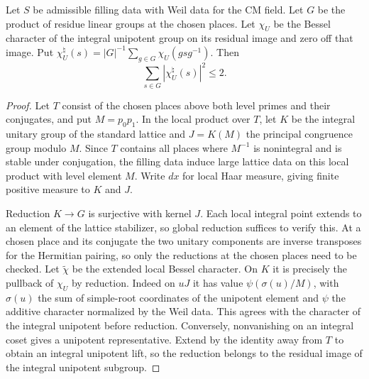 \begin{lemma}
\label{lem:b-conjugation-l2}
\emitthmsource
Let $S$ be admissible filling data with Weil data for the CM field. Let $G$ be the product of residue linear groups at the chosen places.
Let $\chi_U$ be the Bessel character of the integral unipotent group on its residual image and zero off that image.
Put $\chi_U^\natural(s)=|G|^{-1}\sum_{g\in G}\chi_U(gsg^{-1})$.
Then
\[
 \sum_{s\in G}|\chi_U^\natural(s)|^2\le2.
\]
\end{lemma}
\begin{proof}
Let $T$ consist of the chosen places above both level primes and their conjugates, and put $M=p_0p_1$.
In the local product over $T$, let $K$ be the integral unitary group of the standard lattice and $J=K(M)$ the principal congruence group modulo $M$.
Since $T$ contains all places where $M^{-1}$ is nonintegral and is stable under conjugation,
the filling data induce large lattice data on this local product with level element $M$.
Write $dx$ for local Haar measure, giving finite positive measure to $K$ and $J$.

Reduction $K\to G$ is surjective with kernel $J$.
Each local integral point extends to an element of the lattice stabilizer, so global reduction suffices to verify this.
At a chosen place and its conjugate the two unitary components are inverse transposes for the Hermitian pairing,
so only the reductions at the chosen places need to be checked. Let $\widetilde\chi$ be the extended local Bessel character.
On $K$ it is precisely the pullback of $\chi_U$ by reduction. Indeed on
$uJ$ it has value $\psi(\sigma(u)/M)$, with $\sigma(u)$ the sum of simple-root coordinates of the unipotent element and
$\psi$ the additive character normalized by the Weil data.
This agrees with the character of the integral unipotent before reduction. Conversely, nonvanishing on an integral coset
gives a unipotent representative. Extend by the identity away from $T$ to obtain an integral unipotent lift,
so the reduction belongs to the residual image of the integral unipotent subgroup.


\end{proof}
